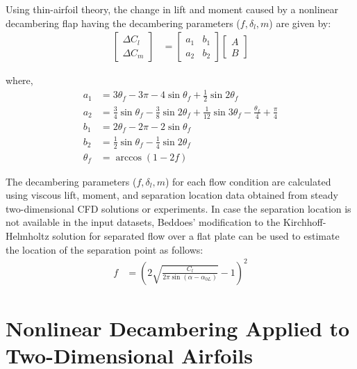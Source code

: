 Using thin-airfoil theory, the change in lift and moment caused by a nonlinear decambering flap having the decambering parameters ($f, \delta_l, m$) are given by:
\begin{align}
    \left[ \begin{array}{c}
         \Delta C_l \\
         \Delta C_m
    \end{array}\right] &= \left[ \begin{array}{cc}
        a_1 & b_1 \\
        a_2 & b_2
    \end{array} \right] \left[ \begin{array}{c}
         A  \\
         B
    \end{array} \right] \label{eqn:decambering-dclcm}
\end{align}

\noindent where,
\begin{align*}
    a_1 &= 3 \theta_f - 3 \pi - 4 \sin \theta_f + \frac{1}{2} \sin 2\theta_f \\
    a_2 &= \frac{3}{4} \sin \theta_f - \frac{3}{8} \sin 2\theta_f + \frac{1}{12} \sin 3\theta_f - \frac{\theta_f}{4} + \frac{\pi}{4} \\
    b_1 &= 2\theta_f - 2\pi - 2 \sin \theta_f \\
    b_2 &= \frac{1}{2} \sin \theta_f - \frac{1}{4} \sin 2\theta_f \\
    \theta_f &= \arccos(1 - 2f)
\end{align*}

The decambering parameters ($f, \delta_l, m$) for each flow condition are calculated using viscous lift, moment, and separation location data obtained from steady two-dimensional CFD solutions or experiments. In case the separation location is not available in the input datasets, Beddoes' modification \cite{Beddoes1983} to the Kirchhoff-Helmholtz solution for separated flow over a flat plate can be used to estimate the location of the separation point as follows:
\begin{align}
    f &= \left(2\sqrt{\frac{C_l}{2\pi \sin(\alpha - \alpha_{0L})}} - 1\right)^2 \label{eqn:beddoes-f}
\end{align}

\section{Nonlinear Decambering Applied to Two-Dimensional Airfoils}
\label{sec:nld-2D}

